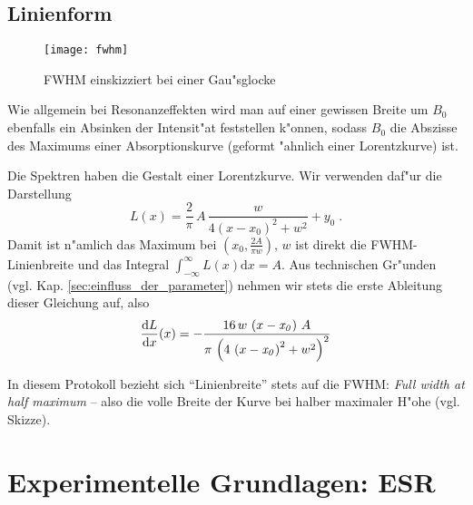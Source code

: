 \documentclass[a4paper,12pt]{article}
\newcommand{\diff}{\ensuremath{\mathrm d}}
\newcommand{\dx}{\ensuremath{\mathrm dx}}
\begin{document}
\subsection{Linienform}
\label{sec:fitten}

\begin{wrapfigure}{l}{0.42\textwidth}
\texttt{[image: fwhm]}  
\caption{FWHM einskizziert bei einer Gau"sglocke}
\end{wrapfigure}


Wie allgemein bei Resonanzeffekten wird man auf einer gewissen Breite
um $B_0$ ebenfalls ein Absinken der Intensit"at feststellen
k"onnen, sodass $B_0$ die Abszisse des Maximums einer Absorptionskurve
(geformt "ahnlich einer Lorentzkurve) ist.


Die Spektren haben die Gestalt einer Lorentzkurve. Wir
verwenden daf"ur die Darstellung
\begin{equation}
  \label{eq:8}
  L(x) = \frac 2 \pi \, A \, \frac{ w } {4( x-x_0 )^2 + w^2 } + y_0 \;.
\end{equation}
Damit ist n"amlich das Maximum bei $(x_0, \frac{2A}{\pi w})$, $w$ ist
direkt die FWHM-Linienbreite und das Integral $\int_{-\infty}^\infty
L(x)\diff x = A$. Aus technischen Gr"unden
(vgl. Kap. \ref{sec:einfluss_der_parameter}) nehmen wir stets die
erste Ableitung dieser Gleichung auf, also
\begin{equation}
  \label{eq:14}
  \frac{\diff L}{\diff x}(x) = -{\frac{16\,w\,\left(x-{\it x_0}\right)\,A}{\pi\,\left(4\,\left(x-
 {\it x_0}\right)^2+w^2\right)^2}}
\end{equation}


In diesem Protokoll bezieht sich "`Linienbreite"' stets auf die FWHM:
\textit{Full width at half maximum}
-- also die volle Breite der Kurve bei halber maximaler H"ohe (vgl. Skizze).








\section{Experimentelle Grundlagen: ESR}
\label{sec:experimentelle_grundlagen:_esr}
\end{document}
